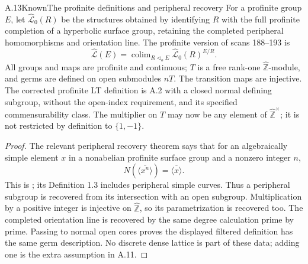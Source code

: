 \begin{statement}{A.13}{Known}{The profinite definitions and peripheral recovery}
For a profinite group $E$, let $\widehat{\mathcal L}_0(R)$
be the structures obtained by identifying $R$ with the full
profinite completion of a hyperbolic surface group, retaining
the completed peripheral homomorphisms and orientation line.
The profinite version of scans 188--193 is
\[
 \widehat{\mathcal L}(E)
   =\mathop{\mathrm{colim}}_{R\triangleleft_o E}
       \widehat{\mathcal L}_0(R)^{E/R}.
\]
All groups and maps are profinite and continuous;
$T$ is a free rank-one $\widehat{\mathbb Z}$-module,
and germs are defined on open submodules $nT$.
The transition maps are injective. The corrected profinite
LT definition is A.2 with a closed normal defining subgroup,
without the open-index requirement, and its specified
commensurability class. The multiplier on $T$ may now be
any element of $\widehat{\mathbb Z}^{\times}$; it is not
restricted by definition to $\{1,-1\}$.
\end{statement}
\begin{proof}
The relevant peripheral recovery theorem says that for an
algebraically simple element $x$ in a nonabelian profinite
surface group and a nonzero integer $n$,
\[
 N(\overline{\langle x^n\rangle})
   =\overline{\langle x\rangle}.
\]
This is \citet[Proposition 3.6]{BoggiZalesskii2019};
its Definition 1.3 includes peripheral simple curves.
Thus a peripheral subgroup is recovered from its intersection
with an open subgroup. Multiplication by a positive integer
is injective on $\widehat{\mathbb Z}$, so its parametrization
is recovered too. The completed orientation line is recovered
by the same degree calculation prime by prime. Passing to
normal open cores proves the displayed filtered definition
has the same germ description. No discrete dense lattice
is part of these data; adding one is the extra assumption
in A.11.
\end{proof}

